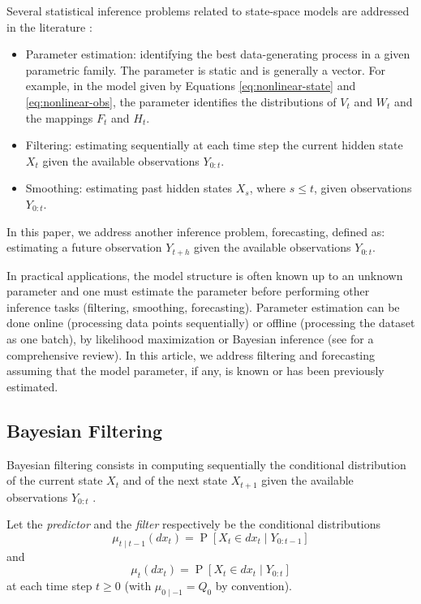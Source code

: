 \documentclass{article}
\DeclareMathOperator{\prob}{P}
\begin{document}
Several statistical inference problems related to state-space models are addressed in the literature \cite{Cappe2005,Kantas2015,Sarkka2013}:
\begin{itemize}
    \item Parameter estimation: identifying the best data-generating process in a given parametric family. The parameter is static and is generally a vector. For example, in the model given by Equations \eqref{eq:nonlinear-state} and \eqref{eq:nonlinear-obs}, the parameter identifies the distributions of $V_t$ and $W_t$ and the mappings $F_t$ and $H_t$.
    \item Filtering: estimating sequentially at each time step the current hidden state $X_t$ given the available observations $Y_{0:t}$.
    \item Smoothing: estimating past hidden states $X_s$, where $s \leq t$, given observations $Y_{0:t}$.
\end{itemize}

In this paper, we address another inference problem, forecasting, defined as: estimating a future observation $Y_{t+h}$ given the available observations $Y_{0:t}$.

In practical applications, the model structure is often known up to an unknown parameter and one must estimate the parameter before performing other inference tasks (filtering, smoothing, forecasting). Parameter estimation can be done online (processing data points sequentially) or offline (processing the dataset as one batch), by likelihood maximization or Bayesian inference (see \cite{Kantas2015} for a comprehensive review). In this article, we address filtering and forecasting assuming that the model parameter, if any, is known or has been previously estimated.
\subsection{Bayesian Filtering}

Bayesian filtering consists in computing sequentially the conditional distribution of the current state $X_t$ and of the next state $X_{t+1}$ given the available observations $Y_{0:t}$ \cite{Cappe2005,Sarkka2013}.

Let the \textit{predictor} and the \textit{filter} respectively be the conditional distributions
\begin{equation*}
    \mu_{t \mid t-1}(dx_t) = \prob[X_t \in dx_t \mid Y_{0:t-1}]
\end{equation*}
and
\begin{equation*}
    \mu_t(dx_t) = \prob[X_t \in dx_t \mid Y_{0:t}]
\end{equation*}
at each time step $t \geq 0$ (with $\mu_{0 \mid -1} = Q_0$ by convention).
\end{document}
